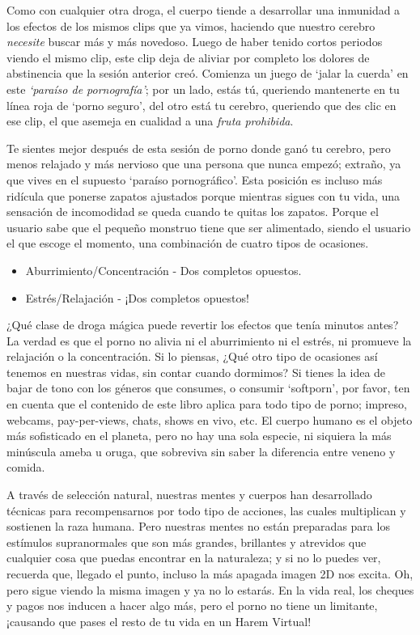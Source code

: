 \documentclass[
  spanish,
  openany]{book}
\providecommand{\tightlist}{%
  \setlength{\itemsep}{0pt}\setlength{\parskip}{0pt}}
\begin{document}
Como con cualquier otra droga, el cuerpo tiende a desarrollar una inmunidad a los efectos de los mismos clips que ya vimos, haciendo que nuestro cerebro \emph{necesite} buscar más y más novedoso. Luego de haber tenido cortos periodos viendo el mismo clip, este clip deja de aliviar por completo los dolores de abstinencia que la sesión anterior creó. Comienza un juego de `jalar la cuerda' en este \emph{`paraíso de pornografía'}; por un lado, estás tú, queriendo mantenerte en tu línea roja de `porno seguro', del otro está tu cerebro, queriendo que des clic en ese clip, el que asemeja en cualidad a una \emph{fruta prohibida}.

Te sientes mejor después de esta sesión de porno donde ganó tu cerebro, pero menos relajado y más nervioso que una persona que nunca empezó; extraño, ya que vives en el supuesto `paraíso pornográfico'. Esta posición es incluso más ridícula que ponerse zapatos ajustados porque mientras sigues con tu vida, una sensación de incomodidad se queda cuando te quitas los zapatos. Porque el usuario sabe que el pequeño monstruo tiene que ser alimentado, siendo el usuario el que escoge el momento, una combinación de cuatro tipos de ocasiones.

\begin{itemize}
\tightlist
\item
  Aburrimiento/Concentración - Dos completos opuestos.
\item
  Estrés/Relajación - ¡Dos completos opuestos!
\end{itemize}

¿Qué clase de droga mágica puede revertir los efectos que tenía minutos antes? La verdad es que el porno no alivia ni el aburrimiento ni el estrés, ni promueve la relajación o la concentración. Si lo piensas, ¿Qué otro tipo de ocasiones así tenemos en nuestras vidas, sin contar cuando dormimos? Si tienes la idea de bajar de tono con los géneros que consumes, o consumir `softporn', por favor, ten en cuenta que el contenido de este libro aplica para todo tipo de porno; impreso, webcams, pay-per-views, chats, shows en vivo, etc. El cuerpo humano es el objeto más sofisticado en el planeta, pero no hay una sola especie, ni siquiera la más minúscula ameba u oruga, que sobreviva sin saber la diferencia entre veneno y comida.

A través de selección natural, nuestras mentes y cuerpos han desarrollado técnicas para recompensarnos por todo tipo de acciones, las cuales multiplican y sostienen la raza humana. Pero nuestras mentes no están preparadas para los estímulos supranormales que son más grandes, brillantes y atrevidos que cualquier cosa que puedas encontrar en la naturaleza; y si no lo puedes ver, recuerda que, llegado el punto, incluso la más apagada imagen 2D nos excita. Oh, pero sigue viendo la misma imagen y ya no lo estarás. En la vida real, los cheques y pagos nos inducen a hacer algo más, pero el porno no tiene un limitante, ¡causando que pases el resto de tu vida en un Harem Virtual!
\end{document}
